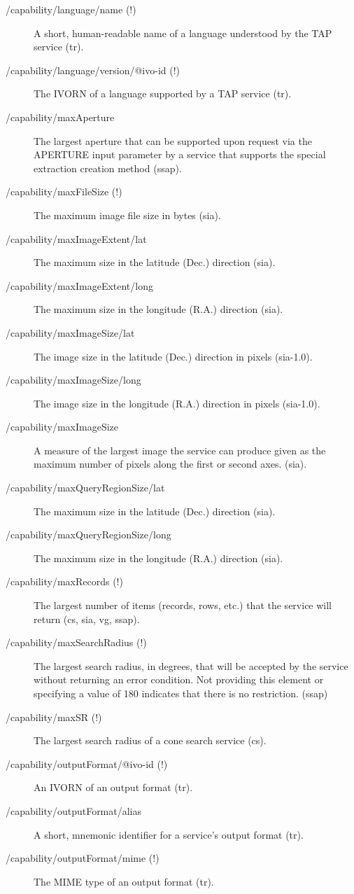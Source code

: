 \documentclass[11pt,a4paper]{ivoa}
\begin{document}
\begin{description}
\item[/capability/language/name (!)]A short, human-readable name of a language understood by the TAP service (tr).
\item[/capability/language/version/@ivo-id (!)]The IVORN of a language supported by a TAP service (tr).
\item[/capability/maxAperture]The largest aperture that can be supported upon request via the APERTURE input parameter by a service that supports the special extraction creation method (ssap).
\item[/capability/maxFileSize (!)]The maximum image file size in bytes (sia).
\item[/capability/maxImageExtent/lat]The maximum size in the latitude (Dec.) direction (sia).
\item[/capability/maxImageExtent/long]The maximum size in the longitude (R.A.) direction (sia).
\item[/capability/maxImageSize/lat]The image size in the latitude (Dec.) direction in pixels (sia-1.0).
\item[/capability/maxImageSize/long]The image size in the longitude (R.A.) direction in pixels (sia-1.0).
\item[/capability/maxImageSize]A measure of the largest image the service can produce given as the maximum number of pixels along the first or second axes. (sia).
\item[/capability/maxQueryRegionSize/lat]The maximum size in the latitude (Dec.) direction (sia).
\item[/capability/maxQueryRegionSize/long]The maximum size in the longitude (R.A.) direction (sia).
\item[/capability/maxRecords (!)]The largest number of items (records, rows, etc.) that the service will return (cs, sia, vg, ssap).
\item[/capability/maxSearchRadius (!)]The largest search radius, in degrees, that will be accepted by the service without returning an error condition. Not providing this element or specifying a value of 180 indicates that there is no restriction. (ssap)
\item[/capability/maxSR (!)]The largest search radius of a cone search service (cs).
\item[/capability/outputFormat/@ivo-id (!)]An IVORN of an output format (tr).
\item[/capability/outputFormat/alias]A short, mnemonic identifier for a service's output format (tr).
\item[/capability/outputFormat/mime (!)]The MIME type of an output format (tr).

\end{description}
\end{document}

